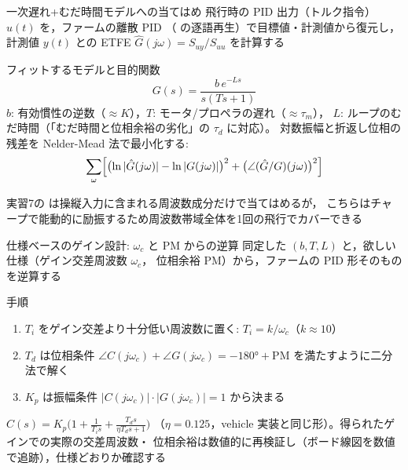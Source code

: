 \begin{frame}{一次遅れ+むだ時間モデルへの当てはめ\later}
  {\footnotesize 飛行時の PID 出力（トルク指令）$u(t)$ を，ファームの離散 PID
  （ の逐語再生）で目標値・計測値から復元し，計測値 $y(t)$
  との ETFE $\hat G(j\omega)=S_{uy}/S_{uu}$ を計算する}

  \begin{block}{フィットするモデルと目的関数}\footnotesize
    \setlength{\abovedisplayskip}{2pt}\setlength{\belowdisplayskip}{2pt}%
    \[
      G(s) = \frac{b\,e^{-Ls}}{s(Ts+1)}
    \]
    $b$: 有効慣性の逆数（$\approx K$），$T$: モータ/プロペラの遅れ（$\approx \tau_m$），
    $L$: ループのむだ時間（「むだ時間と位相余裕の劣化」の $\tau_d$ に対応）。
    対数振幅と折返し位相の残差を Nelder-Mead 法で最小化する:
    \[
      \sum_\omega \Bigl[\bigl(\ln|\hat G(j\omega)|-\ln|G(j\omega)|\bigr)^2
      + \bigl(\angle(\hat G/G)(j\omega)\bigr)^2\Bigr]
    \]
  \end{block}

  {\footnotesize 実習7の  は操縦入力に含まれる周波数成分だけで当てはめるが，
  こちらはチャープで能動的に励振するため周波数帯域全体を1回の飛行でカバーできる}
\end{frame}

\begin{frame}{仕様ベースのゲイン設計: $\omega_c$ と PM からの逆算\later}
  {\footnotesize 同定した $(b,T,L)$ と，欲しい仕様（ゲイン交差周波数 $\omega_c$，
  位相余裕 PM）から，ファームの PID 形そのものを逆算する}

  \begin{block}{手順}\footnotesize
    \begin{enumerate}\setlength{\itemsep}{0.1em}
      \item $T_i$ をゲイン交差より十分低い周波数に置く: $T_i = k/\omega_c$（$k\approx10$）
      \item $T_d$ は位相条件 $\angle C(j\omega_c)+\angle G(j\omega_c) = -180°+\text{PM}$
            を満たすように二分法で解く
      \item $K_p$ は振幅条件 $|C(j\omega_c)|\cdot|G(j\omega_c)|=1$ から決まる
    \end{enumerate}
  \end{block}

  {\footnotesize $C(s)=K_p\bigl(1+\frac{1}{T_i s}+\frac{T_d s}{\eta T_d s+1}\bigr)$
  （$\eta=0.125$，vehicle 実装と同じ形）。得られたゲインでの実際の交差周波数・
  位相余裕は数値的に再検証し（ボード線図を数値で追跡），仕様どおりか確認する}
\end{frame}

